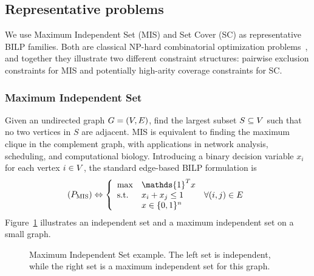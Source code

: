 \subsection{Representative problems}
\label{subsec:background_representative_problems}
We use Maximum Independent Set (MIS) and Set Cover (SC) as representative BILP families. Both are classical NP-hard combinatorial optimization problems~\cite{miller_reducibility_1972}, and together they illustrate two different constraint structures: pairwise exclusion constraints for MIS and potentially high-arity coverage constraints for SC.

\subsubsection{Maximum Independent Set}  
Given an undirected graph $G = (V , E)$, find the largest subset $S \subseteq V$ such that no two vertices in $S$ are adjacent. MIS is equivalent to finding the maximum clique in the complement graph, with applications in network analysis, scheduling, and computational biology. Introducing a binary decision variable $x_i$ for each vertex $i\in V$, the standard edge-based BILP formulation is
\begin{align}
    \label{equ:mis_formulation_edges}
    (P_\text{MIS}) \Leftrightarrow \left\{
    \begin{array}{lll}
        \max        & \mathds{1}^T x   & \\
        \text{s.t.} & x_i + x_j \leq 1 & \forall (i,j) \in \GE \\
                    & x \in \{0,1\}^n
    \end{array}
    \right.
\end{align}
Figure~\ref{fig:mis_example} illustrates an independent set and a maximum independent set on a small graph.

\begin{figure}[H]
	\centering
	
	\hspace{2em}
	
	\caption{Maximum Independent Set example. The left set is independent, while the right set is a maximum independent set for this graph.}
	\label{fig:mis_example}
\end{figure}

